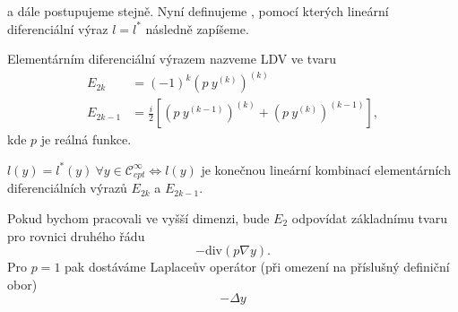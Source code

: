 a dále postupujeme stejně. Nyní definujeme , pomocí kterých lineární diferenciální výraz $l = l^*$ následně zapíšeme.
\begin{definition}
    Elementárním diferenciální výrazem nazveme LDV ve tvaru
    \begin{equation}
        \begin{split}
            E_{2k} &= (-1)^{k} \left(p ~ y^{(k)}\right)^{(k)} \\
            E_{2k-1} &= \frac{i}{2} \left[ \left(p ~ y^{(k-1)}\right)^{(k)} + \left(p ~ y^{(k)}\right)^{(k-1)} \right],
        \end{split}
    \end{equation}
kde $p$ je reálná funkce.
\end{definition}

\begin{theorem}
    $l(y) = l^{*}(y) ~ \forall y \in \mathcal{C}^{\infty}_{cpt} \iff l(y)$ je konečnou lineární kombinací elementárních diferenciálních výrazů  $E_{2k}$ a $E_{2k-1}$.
\end{theorem}


\begin{remark}
    Pokud bychom pracovali ve vyšší dimenzi, bude $E_2$ odpovídat základnímu tvaru pro rovnici druhého řádu
    \begin{equation*}
        - \text{div} (p \nabla y).
    \end{equation*}
    Pro $p=1$ pak dostáváme Laplaceův operátor (při omezení na příslušný definiční obor)
    \begin{equation*}
        -\Delta y
    \end{equation*}
\end{remark}

